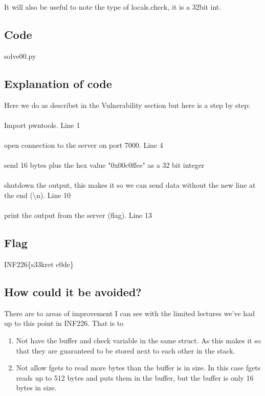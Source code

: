 \documentclass{article}
\begin{document}
It will also be useful to note the type of locals.check, it is a 32bit int.

\subsection{Code}


{solve00.py}

\subsection{Explanation of code}

Here we do as describet in the Vulnerability section but here is a step by step:\\ \\
Import pwntools. Line 1\\ \\
open connection to the server on port 7000. Line 4 \\ \\
send 16 bytes plus the hex value "0x00c0ffee" as a 32 bit integer \\ \\
shutdown the output, this makes it so we can send data without the new line at the end (\textbackslash n). Line 10 \\ \\
print the output from the server (flag). Line 13


\subsection{Flag}
INF226\{s33kret c0de\}

\subsection{How could it be avoided?}
There are to areas of improvement I can see with the limited lectures we've had up to this point in INF226. That is to \begin{enumerate}
    \item Not have the buffer and check variable in the same struct. As this makes it so that they are guaranteed to be stored next to each other in the stack.
    \item Not allow fgets to read more bytes than the buffer is in size. In this case fgets reads up to 512 bytes and puts them in the buffer, but the buffer is only 16 bytes in size.
\end{enumerate}
\end{document}
